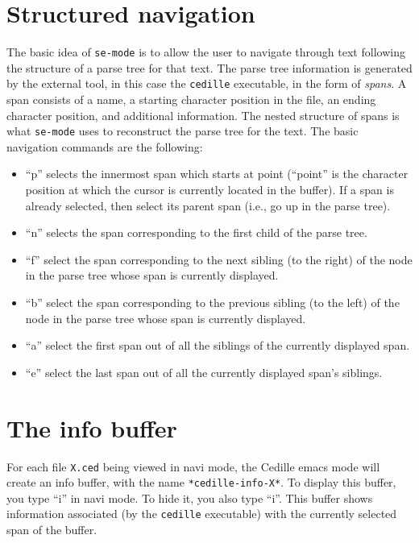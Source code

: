 \documentclass{article}
\begin{document}
\section{Structured navigation}

The basic idea of \verb|se-mode| is to allow the user to navigate
through text following the structure of a parse tree for that text.
The parse tree information is generated by the external tool, in this
case the \verb|cedille| executable, in the form of \emph{spans}.  A
span consists of a name, a starting character position in the file, an
ending character position, and additional information.  The nested
structure of spans is what \verb|se-mode| uses to reconstruct the
parse tree for the text. The basic navigation commands are the
following:

\begin{itemize}
\item ``p'' selects the innermost span which starts at point
  (``point'' is the character position at which the cursor is
  currently located in the buffer).  If a span is already selected,
  then select its parent span (i.e., go up in the parse tree).

\item ``n'' selects the span corresponding to the first child of 
  the parse tree.

\item ``f'' select the span corresponding to the next sibling (to the
  right) of the node in the parse tree whose span is currently
  displayed.  

\item ``b'' select the span corresponding to the previous sibling (to the left) of the node in the parse tree whose span is currently displayed.

\item ``a'' select the first span out of all the siblings of the currently
 displayed span.

\item ``e'' select the last span out of all the currently displayed span's siblings.

\end{itemize}
  
\section{The info buffer}

For each file \verb|X.ced| being viewed in navi mode, the Cedille
emacs mode will create an info buffer, with the name
\verb|*cedille-info-X*|.  To display this buffer, you type ``i'' in
navi mode.  To hide it, you also type ``i''.  This buffer shows
information associated (by the \verb|cedille| executable) with the
currently selected span of the buffer.
\end{document}
